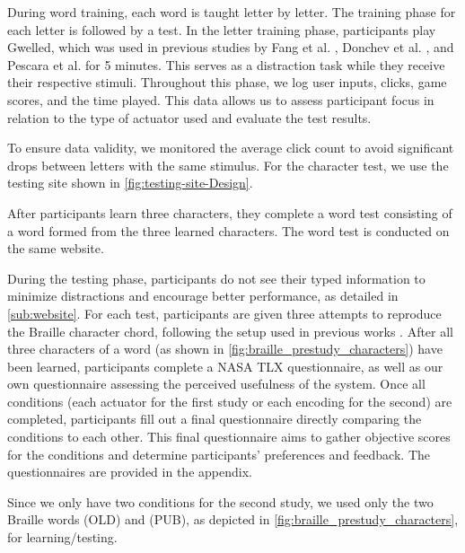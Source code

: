 During word training, each word is taught letter by letter. The training phase for each letter is followed by a test. In the letter training phase, participants play Gwelled, which was used in previous studies by Fang et al. \cite{Fang2023}, Donchev et al. \cite{Donchev2021}, and Pescara et al. \cite{Pescara2019} for 5 minutes. This serves as a distraction task while they receive their respective stimuli. Throughout this phase, we log user inputs, clicks, game scores, and the time played. This data allows us to assess participant focus in relation to the type of actuator used and evaluate the test results.

To ensure data validity, we monitored the average click count to avoid significant drops between letters with the same stimulus. For the character test, we use the testing site shown in \autoref{fig:testing-site-Design}.

After participants learn three characters, they complete a word test consisting of a word formed from the three learned characters. The word test is conducted on the same website.

During the testing phase, participants do not see their typed information to minimize distractions and encourage better performance, as detailed in \autoref{sub:website}. For each test, participants are given three attempts to reproduce the Braille character chord, following the setup used in previous works \cite{Fang2023, Seim2015, Fang2023a}. After all three characters of a word (as shown in \autoref{fig:braille_prestudy_characters}) have been learned, participants complete a NASA TLX \cite{hart1988development} questionnaire, as well as our own questionnaire assessing the perceived usefulness of the system. Once all conditions (each actuator for the first study or each encoding for the second) are completed, participants fill out a final questionnaire directly comparing the conditions to each other. This final questionnaire aims to gather objective scores for the conditions and determine participants' preferences and feedback. The questionnaires are provided in the appendix.

Since we only have two conditions for the second study, we used only the two Braille words  (OLD) and  (PUB), as depicted in \autoref{fig:braille_prestudy_characters}, for learning/testing.
